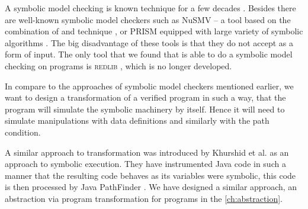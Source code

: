 A symbolic model checking is known technique for a few decades
\cite{McMillan93}. Besides \SymDIVINE there are well-known symbolic model
checkers such as NuSMV -- a tool based on the combination of \SMT and \BDD
technique \cite{Cimatti20}, or PRISM equipped with large variety of symbolic
algorithms \cite{Kwiatkowska20}. The big disadvantage of these tools is that
they do not accept \Cpp{} as a form of input. The only tool that we found that
is able to do a symbolic model checking on \Cpp{} programs is \textsc{redlib}
\cite{redlib}, which is no longer developed.

In compare to the approaches of symbolic model checkers mentioned earlier, we
want to design a transformation of a verified program in such a way, that the
program will simulate the symbolic machinery by itself. Hence it will need to
simulate manipulations with data definitions and similarly with the path
condition.

A similar approach to transformation was introduced by Khurshid et al.
\cite{Khurshid03} as an approach to symbolic execution. They have instrumented
Java code in such a manner that the resulting code behaves as its variables were
symbolic, this code is then processed by Java PathFinder \cite{Havelund20}. We
have designed a similar approach, an abstraction via program transformation for
\LLVM programs in the \autoref{ch:abstraction}.

